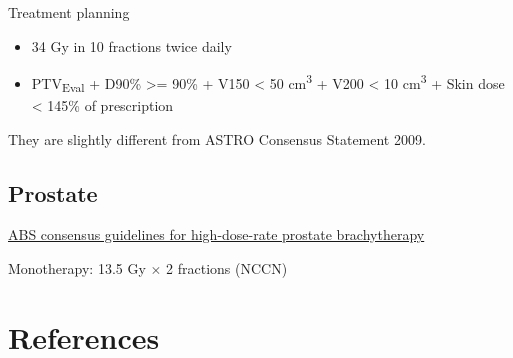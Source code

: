 \documentclass[]{book}
\providecommand{\tightlist}{%
  \setlength{\itemsep}{0pt}\setlength{\parskip}{0pt}}
\theoremstyle{definition}
\theoremstyle{definition}
\theoremstyle{definition}
\theoremstyle{remark}
\begin{document}
Treatment planning

\begin{itemize}
\tightlist
\item
  34 Gy in 10 fractions twice daily
\item
  PTV\textsubscript{Eval} + D90\% \textgreater{}= 90\% + V150
  \textless{} 50 cm\textsuperscript{3} + V200 \textless{} 10
  cm\textsuperscript{3} + Skin dose \textless{} 145\% of prescription
\end{itemize}

They are slightly different from ASTRO Consensus Statement 2009.

\subsection{Prostate}\label{prostate}

\href{https://www.sciencedirect.com/science/article/pii/S1538472111004004}{ABS
consensus guidelines for high-dose-rate prostate brachytherapy}

Monotherapy: 13.5 Gy \(\times\) 2 fractions (NCCN)

\section{References}\label{references}
\end{document}
